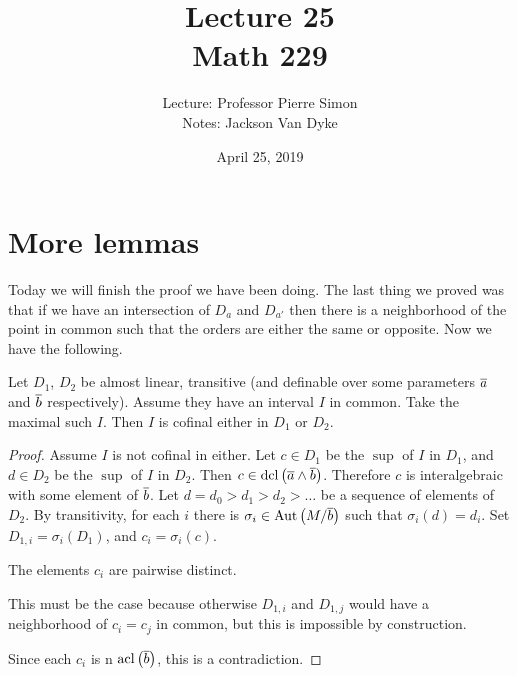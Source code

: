 \documentclass{amsart}
\begin{document}
\title{Lecture 25\\ Math 229}
\author{Lecture: Professor Pierre Simon\\ Notes: Jackson Van Dyke}
\date{April 25, 2019}
\maketitle

\section{More lemmas}

Today we will finish the proof we have been doing. 
The last thing we proved was that if we have an intersection of $D_a$ and $D_{a'}$ then
there is a neighborhood of the point in common such that the orders are either the same or
opposite. 
Now we have the following.

\begin{lem}
Let $D_1$, $D_2$ be almost linear, transitive (and definable over some parameters
$\overline{a}$ and $\overline{b}$ respectively). Assume they have an interval $I$ in common.
Take the maximal such $I$. Then $I$ is cofinal either in $D_1$ or $D_2$.
\end{lem}

\begin{proof}
Assume $I$ is not cofinal in either. Let $c\in D_1$ be the $\sup$ of $I$ in $D_1$, and
$d\in D_2$ be the $\sup$ of $I$ in $D_2$. Then $c\in
\operatorname{dcl}\left(\overline{a}\land\overline{b}\right)$.
Therefore $c$ is interalgebraic with some element of $\overline{b}$.
Let $d = d_0 > d_1 > d_2 > \ldots$ be a sequence of elements of $D_2$. By transitivity,
for each $i$ there is $\sigma_i\in \operatorname{Aut}\left(M / \overline{b}\right)$ such that
$\sigma_i\left(d\right) = d_i$. Set $D_{1,i} = \sigma_i\left(D_1\right)$, and $c_i =
\sigma_i\left(c\right)$.
\begin{clm}
The elements $c_i$ are pairwise distinct.
\end{clm}
This must be the case because otherwise $D_{1,i}$ and $D_{1,j}$ would have a neighborhood
of $c_i = c_j$ in common, but this is impossible by construction.

Since each $c_i$ is n $\operatorname{acl}\left(\overline{b}\right)$, this is a contradiction.
\end{proof}
\end{document}

